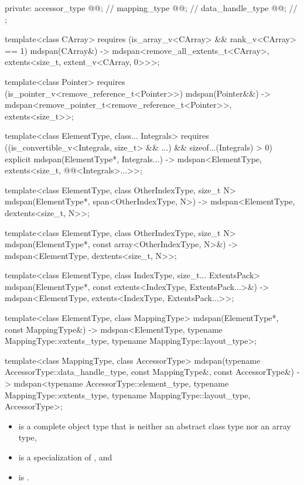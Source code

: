\begin{codeblock}
{{  private:
    accessor_type @@;         // \expos
    mapping_type @@;          // \expos
    data_handle_type @@;      // \expos
  };

  template<class CArray>
    requires (is_array_v<CArray> && rank_v<CArray> == 1)
    mdspan(CArray&)
      -> mdspan<remove_all_extents_t<CArray>, extents<size_t, extent_v<CArray, 0>>>;

  template<class Pointer>
    requires (is_pointer_v<remove_reference_t<Pointer>>)
    mdspan(Pointer&&)
      -> mdspan<remove_pointer_t<remove_reference_t<Pointer>>, extents<size_t>>;

  template<class ElementType, class... Integrals>
    requires ((is_convertible_v<Integrals, size_t> && ...) && sizeof...(Integrals) > 0)
    explicit mdspan(ElementType*, Integrals...)
      -> mdspan<ElementType, extents<size_t, @@<Integrals>...>>;

  template<class ElementType, class OtherIndexType, size_t N>
    mdspan(ElementType*, span<OtherIndexType, N>)
      -> mdspan<ElementType, dextents<size_t, N>>;

  template<class ElementType, class OtherIndexType, size_t N>
    mdspan(ElementType*, const array<OtherIndexType, N>&)
      -> mdspan<ElementType, dextents<size_t, N>>;

  template<class ElementType, class IndexType, size_t... ExtentsPack>
    mdspan(ElementType*, const extents<IndexType, ExtentsPack...>&)
      -> mdspan<ElementType, extents<IndexType, ExtentsPack...>>;

  template<class ElementType, class MappingType>
    mdspan(ElementType*, const MappingType&)
      -> mdspan<ElementType, typename MappingType::extents_type,
                typename MappingType::layout_type>;

  template<class MappingType, class AccessorType>
    mdspan(typename AccessorType::data_handle_type, const MappingType&,
           const AccessorType&)
      -> mdspan<typename AccessorType::element_type, typename MappingType::extents_type,
                typename MappingType::layout_type, AccessorType>;
}
\end{codeblock}

\pnum
\mandates
\begin{itemize}
\item
{} is a complete object type
that is neither an abstract class type nor an array type,
\item
{} is a specialization of , and
\item
{}
is .
\end{itemize}

